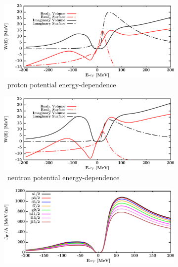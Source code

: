 \begin{figure}[hbtp]
    \begin{subfigure}[b]{0.45\textwidth}
        \centering
        \includegraphics[width=\linewidth]{figures/sn124_protonPotentials.png}
        \caption{\snFour\ proton potential energy-dependence}
        \label{DOMFitData_sn124_proton_potentialComponent_energy}
    \end{subfigure}\hspace{6pt}
    \begin{subfigure}[b]{0.45\linewidth}
        \centering
        \includegraphics[width=\linewidth]{figures/sn124_neutronPotentials.png}
        \caption{\snFour\ neutron potential energy-dependence}
        \label{DOMFitData_sn124_neutron_potentialComponent_energy}
    \end{subfigure}\vspace{0.3in}
    \begin{subfigure}[b]{0.45\textwidth}
        \centering
        \includegraphics[width=\linewidth]{figures/sn124_protonVolumeIntegrals.png}

\end{subfigure}
\end{figure}
